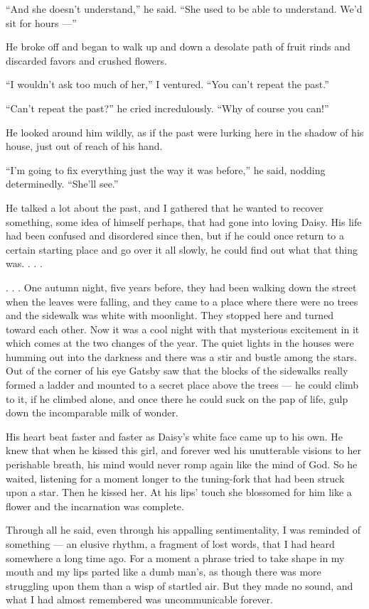 \documentclass{znotebook}
\begin{document}
``And she doesn't understand,'' he said. ``She used to be able to understand. We'd sit for hours ---''

He broke off and began to walk up and down a desolate path of fruit rinds and discarded favors and crushed flowers.

``I wouldn't ask too much of her,'' I ventured. ``You can't repeat the past.''

``Can't repeat the past?'' he cried incredulously. ``Why of course you can!''

He looked around him wildly, as if the past were lurking here in the shadow of his house, just out of reach of his hand.

``I'm going to fix everything just the way it was before,'' he said, nodding determinedly. ``She'll see.''

He talked a lot about the past, and I gathered that he wanted to recover something, some idea of himself perhaps, that had gone into loving Daisy. His life had been confused and disordered since then, but if he could once return to a certain starting place and go over it all slowly, he could find out what that thing was. . . .

. . . One autumn night, five years before, they had been walking down the street when the leaves were falling, and they came to a place where there were no trees and the sidewalk was white with moonlight. They stopped here and turned toward each other. Now it was a cool night with that mysterious excitement in it which comes at the two changes of the year. The quiet lights in the houses were humming out into the darkness and there was a stir and bustle among the stars. Out of the corner of his eye Gatsby saw that the blocks of the sidewalks really formed a ladder and mounted to a secret place above the trees ---{} he could climb to it, if he climbed alone, and once there he could suck on the pap of life, gulp down the incomparable milk of wonder.

His heart beat faster and faster as Daisy's white face came up to his own. He knew that when he kissed this girl, and forever wed his unutterable visions to her perishable breath, his mind would never romp again like the mind of God. So he waited, listening for a moment longer to the tuning-fork that had been struck upon a star. Then he kissed her. At his lips' touch she blossomed for him like a flower and the incarnation was complete.

Through all he said, even through his appalling sentimentality, I was reminded of something ---{} an elusive rhythm, a fragment of lost words, that I had heard somewhere a long time ago. For a moment a phrase tried to take shape in my mouth and my lips parted like a dumb man's, as though there was more struggling upon them than a wisp of startled air. But they made no sound, and what I had almost remembered was uncommunicable forever.
\end{document}
